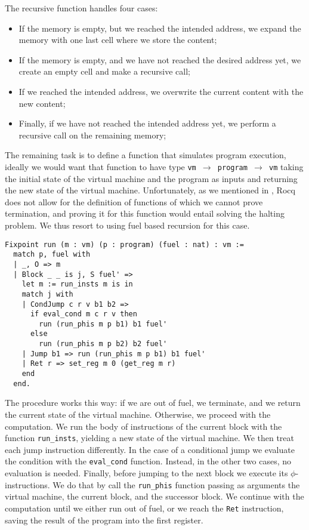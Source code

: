 The recursive function handles four cases:
\begin{itemize}
  \item If the memory is empty, but we reached the intended address, we expand the memory with one last cell where we store the content;
  \item If the memory is empty, and we have not reached the desired address yet, we create an empty cell and make a recursive call;
  \item If we reached the intended address, we overwrite the current content with the new content;
  \item Finally, if we have not reached the intended address yet, we perform a recursive call on the remaining memory;
\end{itemize}

The remaining task is to define a function that simulates program execution, ideally we would want that function to have type \texttt{vm $\to$ program $\to$ vm} taking the initial state of the virtual machine and the program as inputs and returning the new state of the virtual machine.
Unfortunately, as we mentioned in , Rocq does not allow for the definition of functions of which we cannot prove termination, and proving it for this function would entail solving the halting problem. We thus resort to using fuel based recursion for this case.

\begin{lstlisting}[style=Rocq]
Fixpoint run (m : vm) (p : program) (fuel : nat) : vm :=
  match p, fuel with
  | _, O => m
  | Block _ _ is j, S fuel' =>
    let m := run_insts m is in
    match j with
    | CondJump c r v b1 b2 =>
      if eval_cond m c r v then
        run (run_phis m p b1) b1 fuel'
      else
        run (run_phis m p b2) b2 fuel'
    | Jump b1 => run (run_phis m p b1) b1 fuel'
    | Ret r => set_reg m 0 (get_reg m r)
    end
  end.
\end{lstlisting}

The procedure works this way: if we are out of fuel, we terminate, and we return the current state of the virtual machine. Otherwise, we proceed with the computation.
We run the body of instructions of the current block with the function \texttt{run\_insts}, yielding a new state of the virtual machine. We then treat each jump instruction differently. In the case of a conditional jump we evaluate the condition with the \texttt{eval\_cond} function. Instead, in the other two cases, no evaluation is needed. Finally, before jumping to the next block we execute its $\phi$-instructions. We do that by call the \texttt{run\_phis} function passing as arguments the virtual machine, the current block, and the successor block.
We continue with the computation until we either run out of fuel, or we reach the \texttt{Ret} instruction, saving the result of the program into the first register.